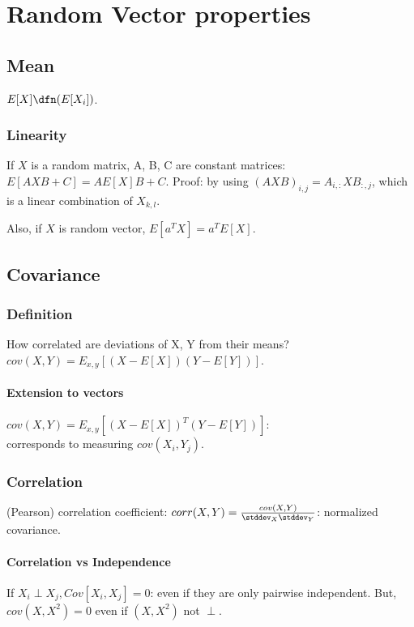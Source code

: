 \documentclass[oneside, article]{memoir}
\begin{document}
\chapter{Random Vector properties}
\section{Mean}
$E[X] \dfn (E[X_i])$.

\subsection{Linearity}
If $X$ is a random matrix, A, B, C are constant matrices: $E[AXB + C] = AE[X]B + C$. Proof: by using $(AXB)_{i, j} = A_{i,:} X B_{:, j}$, which is a linear combination of $X_{k,l}$.

Also, if $X$ is random vector, $E[a^{T}X] = a^{T}E[X]$.

\section{Covariance}
\subsection{Definition}
How correlated are deviations of X, Y from their means?\\
$cov(X, Y) = E_{x, y}[(X - E[X])(Y - E[Y])]$.

\subsubsection{Extension to vectors}
$cov(X, Y) = E_{x, y}[(X - E[X])^{T}(Y - E[Y])]$:\\ corresponds to measuring $cov(X_i, Y_j)$.

\subsection{Correlation}
(Pearson) correlation coefficient: $corr(X, Y) = \frac{cov(X, Y)}{\stddev_{X}\stddev_{Y}}$: normalized covariance.

\subsubsection{Correlation vs Independence}
If $X_{i}\perp X_{j}, Cov[X_{i},X_{j}] = 0$: even if they are only pairwise independent. But, \\
$cov(X, X^{2}) = 0$ even if $(X, X^{2})$ not $\perp$.
\end{document}
